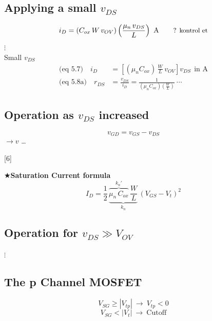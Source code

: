 \documentclass[11pt,a4paper]{article}
\begin{document}
\subsection{Applying a small $v_{DS}$}
\[
  i_D=\left(C_{ox}\,W\,v_{OV}\right)\left(\frac{\mu_n\,v_{DS}}{L}\right)\ \text{A}
  \qquad \text{\small ? kontrol et}
\]
\textcolor{kursunkalem}{$\vdots$}\\
Small $v_{DS}$
\begin{align*}
  \text{(eq 5.7)}\quad i_D &= \left[(\mu_nC_{ox})\,\frac{W}{L}\,v_{OV}\right]v_{DS}\ \ \text{in A} \\
  \text{(eq 5.8a)}\quad r_{DS} &= \frac{v_{DS}}{i_D}=\frac{1}{(\mu_nC_{ox})\left(\frac{W}{L}\right)}\ \cdots
\end{align*}

\subsection{Operation as $v_{DS}$ increased}
\[
  v_{GD}=v_{GS}-v_{DS}
\]
$\rightarrow v$ \dots

\noindent{}
[6]

\noindent\textcolor{kirmizikalem}{$\bigstar$}\quad \textbf{Saturation Current formula}
\[
  I_D=\frac{1}{2}\,\underbrace{\overbrace{\mu_n\,C_{ox}}^{k_n'}\,\frac{W}{L}}_{k_n}\,(V_{GS}-V_t)^2
\]
\begin{center}
\end{center}

\subsection{Operation for $v_{DS}\gg V_{OV}$}
\textcolor{kursunkalem}{$\vdots$}

\subsection{The p Channel MOSFET}
\[
  V_{SG}\geq |V_{tp}| \ \rightarrow\ V_{tp}<0
\]
\[
  V_{SG}<|V_t| \ \rightarrow\ \text{Cutoff}
\]
\end{document}
